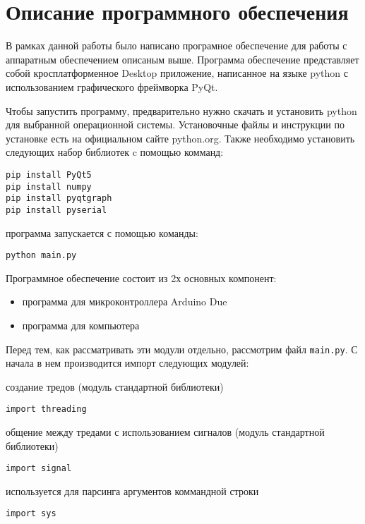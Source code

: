 \documentclass[../main.tex]{subfiles}
\begin{document}
\section{Описание программного обеспечения}

В рамках данной работы было написано програмное обеспечение для работы с аппаратным обеспечением описаным выше. Программа обеспечение представляет собой кросплатформенное Desktop приложение, написанное на языке python с использованием графического фреймворка PyQt.

Чтобы запустить программу, предварительно нужно скачать и установить python для выбранной операционной системы. Установочные файлы и инструкции по установке есть на официальном сайте python.org. Также необходимо установить следующих набор библиотек c помощью комманд:

\begin{lstlisting}
pip install PyQt5
pip install numpy
pip install pyqtgraph
pip install pyserial
\end{lstlisting}


программа запускается с помощью команды:

\begin{lstlisting}
python main.py
\end{lstlisting}


Программное обеспечение состоит из 2х основных компонент:
\begin{itemize}
    \item программа для микроконтроллера Arduino Due
    \item программа для компьютера
\end{itemize}

Перед тем, как рассматривать эти модули отдельно, рассмотрим файл \verb|main.py|. С начала в нем производится импорт следующих модулей:

создание тредов (модуль стандартной библиотеки)
\begin{lstlisting}
import threading       
\end{lstlisting}

общение между тредами с использованием сигналов (модуль стандартной библиотеки)
\begin{lstlisting}
import signal
\end{lstlisting}

используется для парсинга аргументов коммандной строки
\begin{lstlisting}
import sys
\end{lstlisting}
\end{document}
